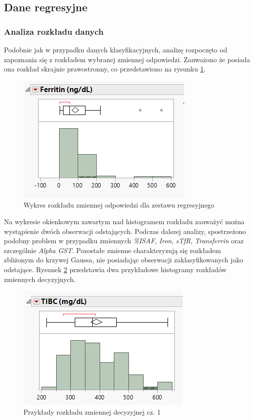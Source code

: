 	\subsection{Dane regresyjne}
	
	\subsubsection{Analiza rozkładu danych}
	
	Podobnie jak w przypadku danych klasyfikacyjnych, analizę rozpoczęto od zapoznania się z rozkładem wybranej zmiennej odpowiedzi. Zauważono że posiada ona rozkład skrajnie prawostronny, co przedstawiono na rysunku \ref{fig:ferritin}.
	
	\begin{figure}[!ht]
		\centering
		\includegraphics[width=0.5\linewidth]{Rozdzial3/ferritin}
		\caption{Wykres rozkładu zmiennej odpowiedzi dla zestawu regresyjnego}
		\label{fig:ferritin}
	\end{figure}
	
	Na wykresie okienkowym zawartym nad histogramem rozkładu zauważyć można wystąpienie dwóch obserwacji odstających. Podczas dalszej analizy, spostrzeżono podobny problem w przypadku zmiennych \textit{\%ISAF}, \textit{Iron}, \textit{sTfR}, \textit{Transferrin} oraz szczególnie \textit{Alpha GST}. Pozostałe zmienne charakteryzują się rozkładem zbliżonym do krzywej Gaussa, nie posiadając obserwacji zaklasyfikowanych jako odstające. Rysunek \ref{fig:decision} przedstawia dwa przykładowe histogramy rozkładów zmiennych decyzyjnych.
	
	\begin{figure}[!ht]
		\centering
		\includegraphics[width=0.6\linewidth]{Rozdzial3/decision}
		\caption{Przykłady rozkładu zmiennej decyzyjnej cz. 1}
		\label{fig:decision}
	\end{figure}

